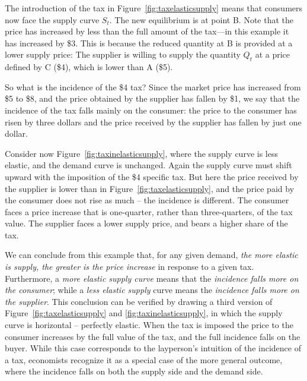 

The introduction of the tax in Figure~\ref{fig:taxelasticsupply} means that consumers now face the supply curve $S_t$. The new equilibrium is at point B. Note that the price has increased by less than the full amount of the tax---in this example it has increased by \$3. This is because the reduced quantity at B is provided at a lower supply price: The supplier is willing to supply the quantity $Q_t$ at a price defined by C (\$4), which is lower than A (\$5).

So what is the incidence of the \$4 tax? Since the market price has increased from \$5 to \$8, and the price obtained by the supplier has fallen by \$1, we say that the incidence of the tax falls mainly on the consumer: the price to the consumer has risen by three dollars and the price received by the supplier has fallen by just one dollar.

Consider now Figure~\ref{fig:taxinelasticsupply}, where the supply curve is less elastic, and the demand curve is unchanged. Again the supply curve must shift upward with the imposition of the \$4 specific tax. But here the price received by the supplier is lower than in Figure~\ref{fig:taxelasticsupply}, and the price paid by the consumer does not rise as much -- the incidence is different. The consumer faces a price increase that is one-quarter, rather than three-quarters, of the tax value. The supplier faces a lower supply price, and bears a higher share of the tax.



We can conclude from this example that, for any given demand, \textit{the more elastic is supply, the greater is the price increase} in response to a given tax. Furthermore, a \textit{more elastic supply curve} means that the \textit{incidence falls more on the consumer}; while a \textit{less elastic supply} curve means the \textit{incidence falls more on the supplier}. This conclusion can be verified by drawing a third version of Figure~\ref{fig:taxelasticsupply} and \ref{fig:taxinelasticsupply}, in which the supply curve is horizontal -- perfectly elastic. When the tax is imposed the price to the consumer increases by the full value of the tax, and the full incidence falls on the buyer. While this case corresponds to the layperson's intuition of the incidence of a tax, economists recognize it as a special case of the more general outcome, where the incidence falls on both the supply side and the demand side.

